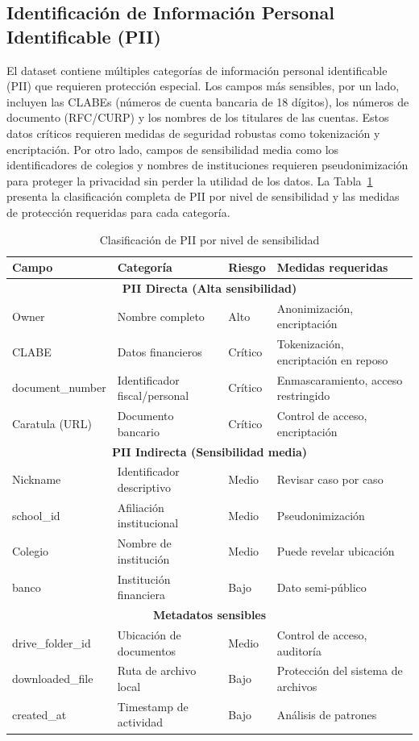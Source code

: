 \subsection{Identificación de Información Personal Identificable (PII)}

El dataset contiene múltiples categorías de información personal identificable (PII) \cite{nist_pii} que requieren protección especial. Los campos más sensibles, por un lado, incluyen las CLABEs (números de cuenta bancaria de 18 dígitos), los números de documento (RFC/CURP) y los nombres de los titulares de las cuentas. Estos datos críticos requieren medidas de seguridad robustas como tokenización y encriptación. Por otro lado, campos de sensibilidad media como los identificadores de colegios y nombres de instituciones requieren pseudonimización para proteger la privacidad sin perder la utilidad de los datos. La Tabla~\ref{tab:clasificacion_pii} presenta la clasificación completa de PII por nivel de sensibilidad y las medidas de protección requeridas para cada categoría.

\begin{table}[htbp]
\centering
\caption{Clasificación de PII por nivel de sensibilidad}
\label{tab:clasificacion_pii}
\scriptsize
\begin{tabular}{|l|l|l|p{4.5cm}|}
\hline
\textbf{Campo} & \textbf{Categoría} & \textbf{Riesgo} & \textbf{Medidas requeridas} \\
\hline
\multicolumn{4}{|c|}{\textbf{PII Directa (Alta sensibilidad)}} \\
\hline
Owner & Nombre completo & Alto & Anonimización, encriptación \\
\hline
CLABE & Datos financieros & Crítico & Tokenización, encriptación en reposo \\
\hline
document\_number & Identificador fiscal/personal & Crítico & Enmascaramiento, acceso restringido \\
\hline
Caratula (URL) & Documento bancario & Crítico & Control de acceso, encriptación \\
\hline
\multicolumn{4}{|c|}{\textbf{PII Indirecta (Sensibilidad media)}} \\
\hline
Nickname & Identificador descriptivo & Medio & Revisar caso por caso \\
\hline
school\_id & Afiliación institucional & Medio & Pseudonimización \\
\hline
Colegio & Nombre de institución & Medio & Puede revelar ubicación \\
\hline
banco & Institución financiera & Bajo & Dato semi-público \\
\hline
\multicolumn{4}{|c|}{\textbf{Metadatos sensibles}} \\
\hline
drive\_folder\_id & Ubicación de documentos & Medio & Control de acceso, auditoría \\
\hline
downloaded\_file & Ruta de archivo local & Bajo & Protección del sistema de archivos \\
\hline
created\_at & Timestamp de actividad & Bajo & Análisis de patrones \\
\hline
\end{tabular}
\end{table}

